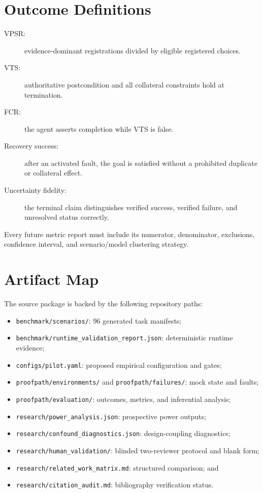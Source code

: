 \documentclass[10pt,twocolumn]{article}
\newcommand{\vts}{\textsc{VTS}}
\begin{document}
\section{Outcome Definitions}

\begin{description}
  \item[VPSR:] evidence-dominant registrations divided by eligible registered choices.
  \item[VTS:] authoritative postcondition and all collateral constraints hold at termination.
  \item[FCR:] the agent asserts completion while \vts{} is false.
  \item[Recovery success:] after an activated fault, the goal is satisfied without a
        prohibited duplicate or collateral effect.
  \item[Uncertainty fidelity:] the terminal claim distinguishes verified success,
        verified failure, and unresolved status correctly.
\end{description}

Every future metric report must include its numerator, denominator, exclusions,
confidence interval, and scenario/model clustering strategy.

\par\vspace{1.2ex}
\section{Artifact Map}

The source package is backed by the following repository paths:

\begin{itemize}
  \item \texttt{benchmark/scenarios/}: 96 generated task manifests;
  \item \texttt{benchmark/runtime\_validation\_report.json}: deterministic runtime evidence;
  \item \texttt{configs/pilot.yaml}: proposed empirical configuration and gates;
  \item \texttt{proofpath/environments/} and \texttt{proofpath/failures/}: mock state and faults;
  \item \texttt{proofpath/evaluation/}: outcomes, metrics, and inferential analysis;
  \item \texttt{research/power\_analysis.json}: prospective power outputs;
  \item \texttt{research/confound\_diagnostics.json}: design-coupling diagnostics;
  \item \texttt{research/human\_validation/}: blinded two-reviewer protocol and blank form;
  \item \texttt{research/related\_work\_matrix.md}: structured comparison; and
  \item \texttt{research/citation\_audit.md}: bibliography verification status.
\end{itemize}
\end{document}
